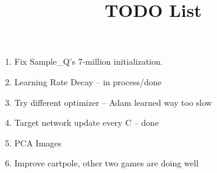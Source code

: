 \documentclass{article}
\title{TODO List}
\begin{document}
\maketitle

\begin{enumerate}
    \item Fix Sample\_Q's 7-million initialization.
    \item Learning Rate Decay -- in process/done
    \item Try different optimizer -- Adam learned way too slow
    \item Target network update every C -- done
    \item PCA Images
    \item  Improve cartpole, other two games are doing well
    
\end{enumerate}
\end{document}
